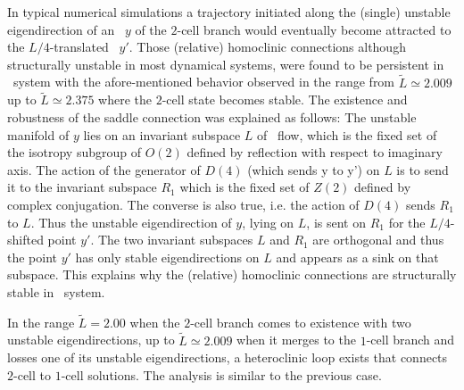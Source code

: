In typical numerical simulations  a trajectory initiated along
the (single) unstable eigendirection of an \eqv\ $y$ of
the $2$-cell branch would eventually become attracted to the
$L/4$-translated \eqv\ $y'$. Those (relative) homoclinic
connections
although structurally unstable in most dynamical systems, were
found to be persistent in \KS\ system with the afore-mentioned
behavior observed in the range from $\tilde{L}\simeq 2.009$ up
to $\tilde{L}\simeq 2.375$  where the $2$-cell state becomes
stable. The existence and robustness of the saddle connection
was explained as follows:  The unstable
manifold of $y$ lies on an invariant subspace $L$ of \KS\ flow,
which is the fixed set of the isotropy subgroup of $O(2)$
defined by reflection with respect to imaginary axis. The
action of the generator of $D(4)$ (which sends y to y') on $L$
is to send it to the invariant subspace $R_{1}$ which is the
fixed set of $Z(2)$ defined by complex conjugation. The
converse is also true, i.e. the action of $D(4)$ sends $R_{1}$
to $L$. Thus the unstable eigendirection of $y$, lying on $L$,
is sent on $R_{1}$ for the $L/4$-shifted point $y'$. The two
invariant subspaces $L$ and $R_{1}$ are orthogonal and thus the
point $y'$ has only stable eigendirections on $L$ and appears
as a sink on that subspace. This explains why the (relative)
homoclinic connections are structurally stable in \KS\ system.

In the range $\tilde{L}=2.00$ when the $2$-cell branch comes to
existence with two unstable eigendirections, up to $\tilde{L}
\simeq 2.009$ when it merges to the $1$-cell branch and losses
one of its unstable eigendirections, a heteroclinic loop exists
that connects $2$-cell to $1$-cell solutions. The analysis is
similar to the previous case.

